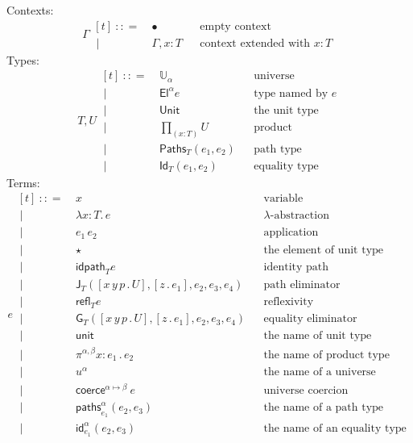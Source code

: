 \documentclass{article}
\newcommand{\G}{\Gamma} %
\newcommand{\T}{T} %
\newcommand{\U}{U} %
\newcommand{\x}{x} %
\newcommand{\e}{e} %
\newcommand{\bnf}{\ \mathrel{{:}{:}{=}}\ }
\newcommand{\bnfor}{\ \mid\ \ }
\newcommand{\ctxempty}{\bullet} %
\newcommand{\ctxextend}[3]{#1, #2 {:} #3} %
\newcommand{\Universe}[1]{\mathbb{U}_{#1}} %
\newcommand{\El}[2]{\mathsf{El}^{#1} #2} %
\newcommand{\Unit}{\mathsf{Unit}} %
\newcommand{\Prod}[2]{{\textstyle\prod_{(#1 {:} #2)}}} %
\newcommand{\lam}[2]{\lambda #1 {:} #2 .\,} %
\newcommand{\app}[2]{#1\,#2} %
\newcommand{\abst}[2]{[#1 \,.\, #2]} %
\newcommand{\unitTerm}{\star} %
\newcommand{\coerce}[3]{\mathsf{coerce}^{#2{\mapsto}#3}\ #1}
\newcommand{\PrEqual}[3]{\mathsf{Paths}_{#1}(#2,#3)} %
\newcommand{\JuEqual}[3]{\mathsf{Id}_{#1}(#2,#3)} %
\newcommand{\PrElim}[6]{\mathsf{J}_{#1}(#2, #3, #4, #5, #6)} %
\newcommand{\JuElim}[6]{\mathsf{G}_{#1}(#2, #3, #4, #5, #6)} %
\newcommand{\prRefl}[1]{\mathsf{idpath}_{#1}}  %
\newcommand{\juRefl}[1]{\mathsf{refl}_{#1}}    %
\newcommand{\nUnit}{\mathsf{unit}} %
\newcommand{\nProd}[3]{\pi^{#1} #2 {:} #3 \,.\,} %
\newcommand{\nUniverse}[1]{u^{#1}}  %
\newcommand{\nPrEqual}[4]{\mathsf{paths}^{#1}_{#2}(#3,#4)} %
\newcommand{\nJuEqual}[4]{\mathsf{id}^{#1}_{#2}(#3,#4)} %
\begin{document}
Contexts:
%
\begin{equation*}
  \G
  \begin{aligned}[t]
    \bnf   {}& \ctxempty & & \text{empty context}\\
    \bnfor {}& \ctxextend{\G}{\x}{\T} & & \text{context extended with $x : T$}
  \end{aligned}
\end{equation*}
%
Types:
%
\begin{equation*}
  \T, \U
  \begin{aligned}[t]
    \bnf   {}& \Universe{\alpha} & & \text{universe}\\
    \bnfor {}& \El{\alpha}{\e} & & \text{type named by $e$}\\
    \bnfor {}& \Unit & & \text{the unit type}\\
    \bnfor {}& \Prod{x}{\T} \U & & \text{product}\\
    \bnfor {}& \PrEqual{T}{\e_1}{\e_2} & & \text{path type}\\
    \bnfor {}& \JuEqual{T}{\e_1}{\e_2} & & \text{equality type}   
  \end{aligned}
\end{equation*}
%
Terms:
%
\begin{equation*}
  \e
  \begin{aligned}[t]
    \bnf   {}&  \x   &&\text{variable} \\
    \bnfor {}&  \lam{\x}{\T} \e  &&\text{$\lambda$-abstraction} \\
    \bnfor {}&   \app{\e_1}{\e_2}  &&\text{application} \\
    \bnfor {}&  \unitTerm  &&\text{the element of unit type} \\
    \bnfor {}&  \prRefl{\T}{\e}  &&\text{identity path} \\
    \bnfor {}&  \PrElim{\T}{\abst{x\,y\,p}{\U}}{\abst{z}{\e_1}}{\e_2}{\e_3}{\e_4}  &&\text{path eliminator} \\
    \bnfor {}&  \juRefl{\T}{\e}  &&\text{reflexivity} \\
    \bnfor {}&  \JuElim{\T}{\abst{x\,y\,p}{\U}}{\abst{z}{\e_1}}{\e_2}{\e_3}{\e_4}  &&\text{equality eliminator} \\
    \bnfor {}&  \nUnit  &&\text{the name of unit type} \\
    \bnfor {}&  \nProd{\alpha,\beta}{\x}{\e_1} \e_2  &&\text{the name of product type} \\
    \bnfor {}&  \nUniverse{\alpha} &&\text{the name of a universe} \\
    \bnfor {}&  \coerce{\e}{\alpha}{\beta}  &&\text{universe coercion} \\
    \bnfor {}&  \nPrEqual{\alpha}{\e_1}{\e_2}{\e_3}  &&\text{the name of a path type} \\
    \bnfor {}&  \nJuEqual{\alpha}{\e_1}{\e_2}{\e_3}  &&\text{the name of an equality type}
  \end{aligned}
\end{equation*}
\end{document}
